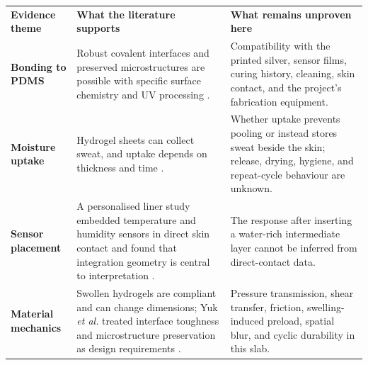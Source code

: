\vspace{0.65em}
\begingroup
\fontsize{8.65}{10.15}\selectfont
\renewcommand{\arraystretch}{1.12}
\begin{tabularx}{\linewidth}{>{\raggedright\arraybackslash\bfseries\color{AUBRed}}p{2.65cm}Y Y}
\color{white}\textbf{Evidence theme} &
\color{white}\textbf{What the literature supports} &
\color{white}\textbf{What remains unproven here} \\
Bonding to PDMS & Robust covalent interfaces and preserved microstructures are
possible with specific surface chemistry and UV processing
\cite{yuk2016}. & Compatibility with the printed silver, sensor films, curing
history, cleaning, skin contact, and the project's fabrication equipment. \\
Moisture uptake & Hydrogel sheets can collect sweat, and uptake depends on
thickness and time \cite{lu2025}. & Whether uptake prevents pooling or instead
stores sweat beside the skin; release, drying, hygiene, and repeat-cycle
behaviour are unknown. \\
Sensor placement & A personalised liner study embedded temperature and humidity
sensors in direct skin contact and found that integration geometry is central
to interpretation \cite{paterno2020}. & The response after inserting a
water-rich intermediate layer cannot be inferred from direct-contact data. \\
Material mechanics & Swollen hydrogels are compliant and can change dimensions;
Yuk \textit{et al.} treated interface toughness and microstructure preservation
as design requirements \cite{yuk2016}. & Pressure transmission, shear transfer,
friction, swelling-induced preload, spatial blur, and cyclic durability in this
slab. \\
\end{tabularx}
\endgroup
{}

\vspace{0.5em}

\clearpage
{}

